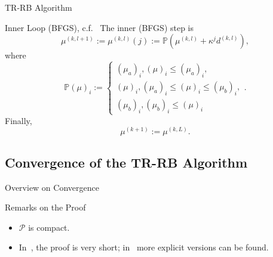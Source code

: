 \begin{frame}{TR-RB Algorithm}
    \begin{block}{Inner Loop (BFGS), c.f.~\cite{Qian2017, Keil2021}}
        The inner (BFGS) step is
        \begin{equation*}
            \mu^{(k, l + 1)} := \mu^{(k, l)}(j) := \mathbb{P}(\mu^{(k, l)} + \kappa^j d^{(k, l)}),
        \end{equation*}
        where
        \begin{equation*}
            {\mathbb{P}(\mu)}_i := \begin{cases}
                {(\mu_a)}_i, {(\mu)}_i \leq {(\mu_a)}_i, \\
                {(\mu)}_i, {(\mu_a)}_i \leq {(\mu)}_i \leq {(\mu_b)}_i, \\
                {(\mu_b)}_i, {(\mu_b)}_i \leq {(\mu)}_i
            \end{cases}.
        \end{equation*}
        Finally,
        \begin{equation*}
            \mu^{(k + 1)} := \mu^{(k, L)}.
        \end{equation*}
    \end{block}
\end{frame}

\subsection{Convergence of the TR-RB Algorithm}

\begin{frame}{Overview on Convergence}
    \begin{block}{Remarks on the Proof}
        \begin{itemize}
            \item $\mathcal{P}$ is compact.
            \item In~\cite{Keil2021}, the proof is very short; in~\cite{Qian2017} more explicit versions can be found.
        \end{itemize}
    \end{block}
\end{frame}

